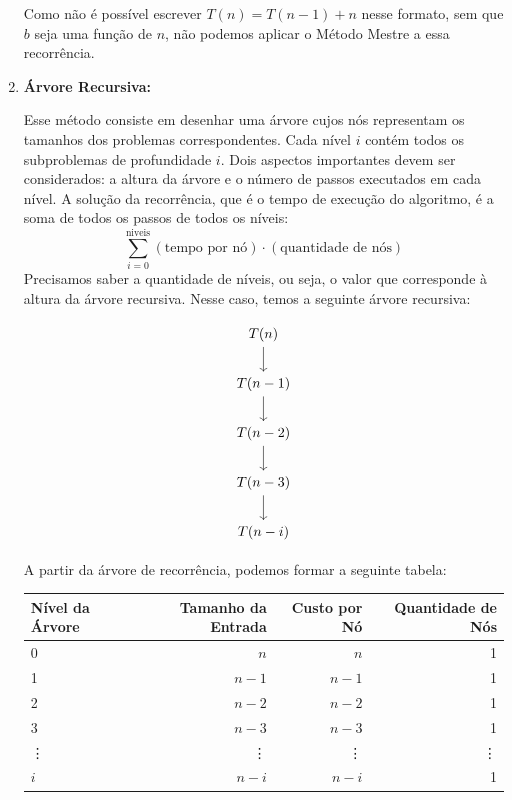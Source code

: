 \begin{enumerate}
	      Como não é possível escrever \( T(n) = T(n-1) + n \) nesse formato, sem que \( b \) seja uma função de \( n \), não podemos aplicar o Método Mestre a essa recorrência.


	\item \textbf{Árvore Recursiva:}

	      Esse método consiste em desenhar uma árvore cujos nós representam os tamanhos dos problemas correspondentes. Cada nível \( i \) contém todos os subproblemas de profundidade \( i \). Dois aspectos importantes devem ser considerados: a altura da árvore e o número de passos executados em cada nível. A solução da recorrência, que é o tempo de execução do algoritmo, é a soma de todos os passos de todos os níveis:
	      \[
		      \sum_{i=0}^{\text{niveis}} (\text{tempo por nó}) \cdot (\text{quantidade de nós})
	      \]
	      Precisamos saber a quantidade de níveis, ou seja, o valor que corresponde à altura da árvore recursiva. Nesse caso, temos a seguinte árvore recursiva:

	      \[\begin{tikzcd}
			      {T(n)} \\
			      {T(n-1)} \\
			      {T(n-2)} \\
			      {T(n-3)} \\
			      {T(n-i)}
			      \arrow[from=1-1, to=2-1]
			      \arrow[from=2-1, to=3-1]
			      \arrow[from=3-1, to=4-1]
			      \arrow[from=4-1, to=5-1]
		      \end{tikzcd}\]

	      A partir da árvore de recorrência, podemos formar a seguinte tabela:

	      \begin{table}[h!]
		      \centering
		      \begin{tabular}{lrrr}
			      \toprule
			      Nível da Árvore & Tamanho da Entrada & Custo por Nó & Quantidade de Nós \\
			      \midrule
			      0               & \( n \)            & \( n \)      & 1                 \\
			      1               & \( n-1 \)          & \( n-1 \)    & 1                 \\
			      2               & \( n-2 \)          & \( n-2 \)    & 1                 \\
			      3               & \( n-3 \)          & \( n-3 \)    & 1                 \\
			      \vdots          & \vdots             & \vdots       & \vdots            \\
			      \( i \)         & \( n-i \)          & \( n-i \)    & 1                 \\
			      \bottomrule
		      \end{tabular}
	      \end{table}


\end{enumerate}
